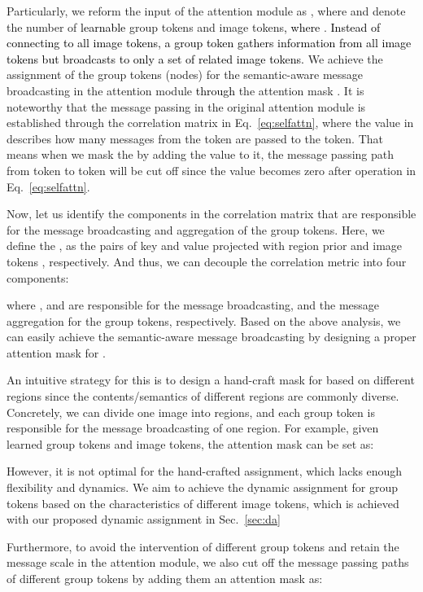 \documentclass[journal]{IEEEtran}
\newcommand{\tcb}{\textcolor{black}}
\begin{document}
Particularly, we reform the input of the attention module as , where  and  denote the number of \tcb{learnable} group tokens and image tokens\tcb{, where }.
\tcb{Instead of connecting to all image tokens, a group token gathers information from all image tokens but broadcasts to only a set of related image tokens.} 
We achieve the assignment of the group tokens (nodes) for the semantic-aware message broadcasting in the attention module \tcb{through} the attention mask . It is noteworthy that the message passing in the original attention module is established through the correlation matrix  in Eq.~\ref{eq:selfattn}, where the value  in  describes how many messages from the  token are passed to the  token. That means when we mask the  by adding the value  to it, the message passing path from  token to  token will be cut off since the value becomes zero after  operation in Eq.~\ref{eq:selfattn}. 

Now, let us identify the components in the correlation matrix  that are responsible for the message broadcasting and aggregation of the group tokens. Here, we define the ,   as the pairs of key and value projected with region prior  and image tokens , respectively. And thus, we can decouple the correlation metric  into four components:

where , and  are responsible for the message broadcasting, and the message aggregation for the group tokens, respectively. Based on the above analysis, we can easily achieve the semantic-aware message broadcasting by designing a proper attention mask  for . 

An intuitive strategy for this is to design a hand-craft mask  for  based on different regions since the contents/semantics of different regions are commonly diverse. Concretely, we can divide one image into  regions, and each group token is responsible for the message broadcasting of one region. For example, given  learned group tokens and  image tokens, the attention mask  can be set as:

 However, it is not optimal for the hand-crafted assignment, which lacks enough flexibility and dynamics. We aim to achieve the dynamic assignment for group tokens based on the characteristics of different image tokens, which is achieved with our proposed dynamic assignment in Sec.~\ref{sec:da} 
 


Furthermore, to avoid the intervention of different group tokens and retain the message scale in the attention module, we also cut off the message passing paths of different group tokens by adding them an attention mask  as: 
\end{document}
